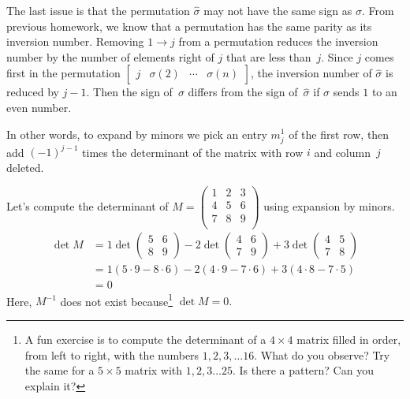 The last issue is that the permutation $\hat{\sigma}$ may not have the same sign as $\sigma$.  From previous homework, we know that a permutation has the same parity as its inversion number.  Removing $1\rightarrow j$ from a permutation  reduces the inversion number by the number of elements right of $j$ that are less than~$j$.  Since $j$ comes first in the permutation $\begin{bmatrix}j & \sigma(2) & \cdots & \sigma(n) \end{bmatrix}$, the inversion number of $\hat{\sigma}$ is reduced by $j-1$.  Then the sign of~$\sigma$ differs from the sign of~$\hat{\sigma}$ if $\sigma$ sends $1$ to an even number.

In other words, to expand by minors we pick an entry $m^1_j$ of the first row, then add $(-1)^{j-1}$ times the determinant of the matrix with row $i$ and column~$j$ deleted.

\begin{example}
Let's compute the determinant of 
$M=\begin{pmatrix}
1 & 2 & 3 \\
4 & 5 & 6 \\
7 & 8 & 9 \\
\end{pmatrix}$ using expansion by minors.
\begin{align*}
\det M & = 1\det \begin{pmatrix}
5 & 6 \\
8 & 9
\end{pmatrix}
-2 \det \begin{pmatrix}
4 & 6 \\
7 & 9
\end{pmatrix}
+3 \det \begin{pmatrix}
4 & 5 \\
7 & 8
\end{pmatrix} \\
& = 1(5\cdot 9- 8\cdot 6) -2 (4\cdot 9- 7\cdot 6) + 3 (4\cdot 8- 7\cdot 5) \\
& = 0
\end{align*}
Here, $M^{-1}$ does not exist because\footnote{A fun exercise is to compute the determinant of a $4\times 4$ matrix filled in order, from left to right,  with the numbers $1,2,3,\ldots 16$. What do you observe? Try the same for a $5\times 5$ matrix with $1,2,3\ldots 25$. Is there a pattern? Can you explain it?} $\det M=0.$
\end{example}



